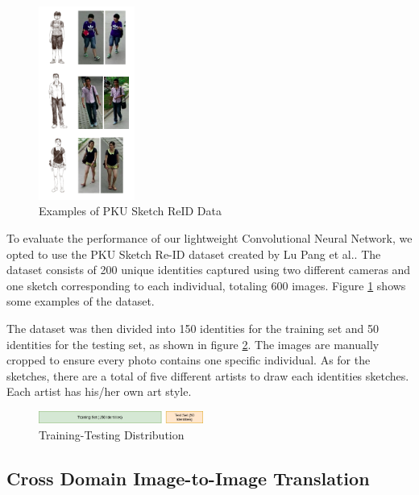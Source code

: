 \documentclass[conference]{IEEEtran}
\begin{document}
	\begin{figure}[h!] \centering
		\includegraphics[width=0.28\textwidth]{img/ExamplesSketchReID.png}
		\caption{Examples of PKU Sketch ReID Data}
		\label{fig:2}
	\end{figure}
    
    \vspace{1ex}
	
	To evaluate the performance of our lightweight Convolutional Neural Network, we opted to use the PKU Sketch Re-ID dataset created by Lu Pang et al.. The dataset consists of 200 unique identities captured using two different cameras and one sketch corresponding to each individual, totaling 600 images. Figure \ref{fig:2} shows some examples of the dataset. 
	
	The dataset was then divided into 150 identities for the training set and 50 identities for the testing set, as shown in figure \ref{fig:3}. The images are manually cropped to ensure every photo contains one specific individual. As for the sketches, there are a total of five different artists to draw each identities sketches. Each artist has his/her own art style. 
	
	\begin{figure}[h!] \centering
		\includegraphics[width=0.48\textwidth]{img/TraintestSplit.png}
		\caption{Training-Testing Distribution}
		\label{fig:3}
	\end{figure}
	
	\vspace{1ex}
	
	\subsection{Cross Domain Image-to-Image Translation}
	\vspace{1ex}
	
\end{document}
